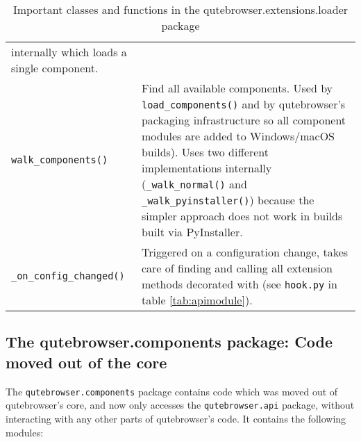 \begin{table}[p]
\begin{tabulary}{\linewidth}{lL}
                               internally which loads a single component. \\
    \verb|walk_components()| & Find all available components. Used by
                               \verb|load_components()| and by qutebrowser's
                               packaging infrastructure so all component modules
                               are added to Windows/macOS builds). Uses two
                               different implementations internally (\verb|_walk_normal()| and
                               \verb|_walk_pyinstaller()|) because the simpler
                               approach does not work in builds built via PyInstaller. \\
    \verb|_on_config_changed()| & Triggered on a configuration change, takes
                                  care of finding and calling all extension
                                  methods decorated with
                                   (see
                                  \verb|hook.py| in table \ref{tab:apimodule}). \\
    \bottomrule
  \end{tabulary}
  \caption{Important classes and functions in the qutebrowser.extensions.loader
  package}
  \label{tab:loadermod}
\end{table}

\subsection[The qutebrowser.components package]{The qutebrowser.components
  package: Code moved out of the core}
\label{sec:components}

The \verb|qutebrowser.components| package contains code which was moved out of
qutebrowser's core, and now only accesses the \verb|qutebrowser.api| package,
without interacting with any other parts of qutebrowser's code. It contains the
following modules:

